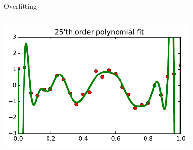 \documentclass[10pt, aspectratio=169]{beamer} %
\newcommand{\leveys}{0.75\textwidth}
\begin{document}
\begin{frame}{Overfitting}
\begin{columns}
\includegraphics[width=\leveys]{timeSeries_25.pdf}
\end{columns}
\end{frame}
\end{document}
